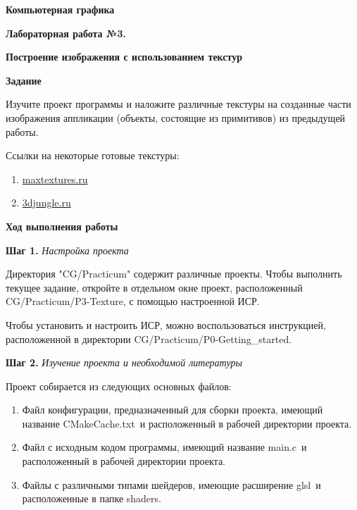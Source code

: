 \documentclass[a4paper,12pt]{article}
\begin{document}
\fontsize{14pt}{16pt}\selectfont
\begin{center}
    \textbf{{\Large Компьютерная графика}}
    
    \textbf{{\large Лабораторная работа №3. }}
    
    \textbf{{\large Построение изображения с использованием текстур}}
    \end{center}
    
    
    \textbf{Задание}
    
    Изучите проект программы и наложите различные текстуры на созданные части изображения аппликации (объекты, состоящие из примитивов) из предыдущей работы.
    
    Ссылки на некоторые готовые текстуры:
    \begin{enumerate}
        \item \href{https://maxtextures.ru/katalog-tekstur.html}{maxtextures.ru}
        \item \href{https://3djungle.ru/textures/}{3djungle.ru}
    \end{enumerate}
    
    \textbf{Ход выполнения работы}
    
    \textbf{Шаг 1.} \textit{Настройка проекта}
    
    Директория "CG/Practicum" содержит различные проекты. Чтобы выполнить текущее задание, откройте в отдельном окне проект, расположенный \textquotedbl CG/Practicum/P3-Texture\textquotedbl, с помощью настроенной ИСР.

    Чтобы установить и настроить ИСР, можно воспользоваться инструкцией, расположенной в директории 
    \textquotedbl CG/Practicum/P0-Getting\_started\textquotedbl .
    
    \textbf{Шаг 2.} \textit{Изучение проекта и необходимой литературы}
    
    Проект собирается из следующих основных файлов:
    
    \begin{enumerate}
        \item Файл конфигурации, предназначенный для сборки проекта, имеющий название \textquotedbl CMakeCache.txt\textquotedbl~и расположенный в рабочей директории проекта.
        \item Файл с исходным кодом программы, имеющий название \textquotedbl main.c\textquotedbl~и расположенный в рабочей директории проекта.
        \item Файлы с различными типами шейдеров, имеющие расширение \textquotedbl glsl\textquotedbl~и расположенные в папке \textquotedbl shaders\textquotedbl.
    \end{enumerate}
    
\end{document}
